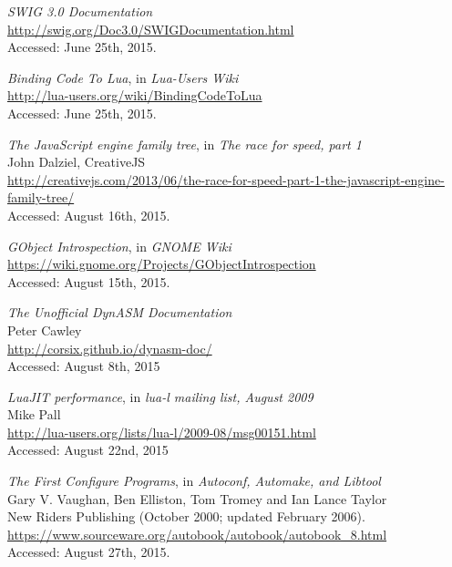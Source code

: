 \begin{thebibliography}{99}
		\emph{SWIG 3.0 Documentation} \\
		\url{http://swig.org/Doc3.0/SWIGDocumentation.html} \\
		Accessed: June 25th, 2015.

		\emph{Binding Code To Lua}, in \emph{Lua-Users Wiki} \\
		\url{http://lua-users.org/wiki/BindingCodeToLua} \\
		Accessed: June 25th, 2015.

		\emph{The JavaScript engine family tree},
		in \emph{The race for speed, part 1}  \\
		John Dalziel, CreativeJS \\
		\url{http://creativejs.com/2013/06/the-race-for-speed-part-1-the-javascript-engine-family-tree/} \\
		Accessed: August 16th, 2015.

		\emph{GObject Introspection}, in \emph{GNOME Wiki} \\
		\url{https://wiki.gnome.org/Projects/GObjectIntrospection} \\
		Accessed: August 15th, 2015.

		\emph{The Unofficial DynASM Documentation} \\
		Peter Cawley \\
		\url{http://corsix.github.io/dynasm-doc/} \\
		Accessed: August 8th, 2015

		\emph{LuaJIT performance}, in \emph{lua-l mailing list, August 2009} \\
		Mike Pall \\
		\url{http://lua-users.org/lists/lua-l/2009-08/msg00151.html} \\
		Accessed: August 22nd, 2015

		\emph{The First Configure Programs},
		in \emph{Autoconf, Automake, and Libtool} \\
		Gary V. Vaughan, Ben Elliston, Tom Tromey and Ian Lance Taylor \\
		New Riders Publishing (October 2000; updated February 2006). \\
		\url{https://www.sourceware.org/autobook/autobook/autobook_8.html} \\
		Accessed: August 27th, 2015.

\end{thebibliography}

